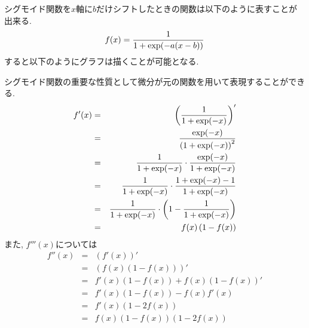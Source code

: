 \documentclass[dvipdfmx,a4j]{jsarticle}
\begin{document}
              シグモイド関数を$x$軸に$b$だけシフトしたときの関数は以下のように表すことが出来る.
              \begin{align*}
                f(x) = \frac{1}{1+{\rm exp}(-a(x-b))}
              \end{align*}
              すると以下のようにグラフは描くことが可能となる.
              \begin{center}
              \end{center}
              シグモイド関数の重要な性質として微分が元の関数を用いて表現することができる.
              \begin{eqnarray*}
                f'(x)&=&\left(\frac{1}{1+{\rm exp}(-x)}\right)'\\
                     &=&\frac{{\rm exp}(-x)}{\left(1+{\rm exp}(-x)\right)^{2}}\\
                     &=&\frac{1}{1+{\rm exp}(-x)}\cdot \frac{{\rm exp}(-x)}{1+{\rm exp}(-x)}\\
                     &=&\frac{1}{1+{\rm exp}(-x)}\cdot \frac{1+{\rm exp}(-x)-1}{1+{\rm exp}(-x)}\\
                     &=&\frac{1}{1+{\rm exp}(-x)}\cdot \left(1-\frac{1}{1+{\rm exp}(-x)}\right)\\
                     &=&f(x)\left(1-f(x)\right)
              \end{eqnarray*}
              また, $f'''(x)$については
              \begin{eqnarray*}
                f''(x) &=& \left(f'(x)\right)'\\
                       &=& \left(f(x)(1-f(x))\right)'\\
                       &=& f'(x)(1-f(x))+f(x)(1-f(x))'\\
                       &=& f'(x)(1-f(x))-f(x)f'(x)\\
                       &=& f'(x)(1-2f(x))\\
                       &=& f(x)(1-f(x))(1-2f(x))
              \end{eqnarray*}
\end{document}
